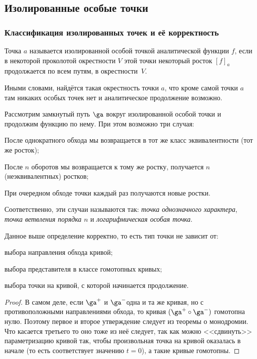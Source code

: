 \documentclass[a4paper]{article}
\begin{document}
\subsection{Изолированные особые точки}

\subsubsection{Классификация изолированных точек и её корректность}

\begin{df}
Точка $a$ называется изолированной особой точкой аналитической функции $f$, если в некоторой проколотой
окрестности $V$ этой точки некоторый росток $[f]_a$ продолжается по всем путям, в окрестности~$V$.
\end{df}

Иными словами, найдётся такая окрестность точки $a$, что кроме самой точки $a$ там никаких особых точек нет
и аналитическое продолжение возможно.

\begin{df}
Рассмотрим замкнутый путь $\ga$ вокруг изолированной особой точки и продолжим функцию по нему. При этом возможно
три случая:

\begin{nums}{-2}
\item После однократного обхода мы возвращается в тот же класс эквивалентности (тот же росток);
\item После $n$ оборотов мы возвращается к тому же ростку,  получается $n$ (неэквивалентных) ростков;
\item При очередном обходе точки каждый раз получаются новые ростки.
\end{nums}

Соответственно, эти случаи называются так: \emph{точка однозначного характера}, \emph{точка ветвления порядка $n$} и
\emph{логарифмическая особая точка}.
\end{df}

\begin{stm}
Данное выше определение корректно, то есть тип точки не зависит от:
\begin{items}{-2}
\item выбора направления обхода кривой;
\item выбора представителя в классе гомотопных кривых;
\item выбора точки на кривой, с которой начинается продолжение.
\end{items}
\end{stm}
\begin{proof}
В самом деле, если $\ga^+$ и $\ga^-$\т одна и та же кривая, но с противоположными направлениями обхода, то
кривая $(\ga^+ \circ \ga^-)$ гомотопна нулю. Поэтому первое и второе утверждение следует из теоремы о монодромии.
Что касается третьего то оно тоже из неё следует, так как можно <<сдвинуть>> параметризацию кривой так, чтобы
произвольная точка на кривой оказалась в начале (то есть соответствует значению $t=0$), а такие кривые гомотопны.
\end{proof}
\end{document}
